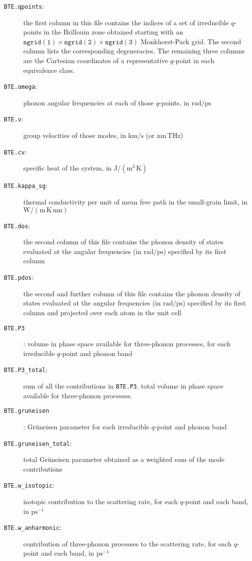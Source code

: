 \documentclass[a4paper,10pt,english]{article}
\begin{document}
\begin{description}
\item[\texttt{BTE.qpoints}:] the first column in this file contains the indices of a set of irreducible $q$-points in the Brillouin zone obtained starting with an $\mathtt{ngrid\left(1\right)}\times\mathtt{ngrid\left(2\right)}\times\mathtt{ngrid\left(3\right)}$ Monkhorst-Pack grid. The second column lists the corresponding degeneracies. The remaining three columns are the Cartesian coordinates of a representative $q$-point in each equivalence class.
\item[\texttt{BTE.omega}:] phonon angular frequencies at each of those $q$-points, in $\mathrm{rad/ps}$
\item[\texttt{BTE.v}:] group velocities of those modes, in $\mathrm{km/s}$ (or $\mathrm{nm}\,\mathrm{THz}$)
\item[\texttt{BTE.cv}:] specific heat of the system, in $\mathrm{J/\left(m^3\,K\right)}$
\item[\texttt{BTE.kappa\_sg}:] thermal conductivity per unit of mean free path in the small-grain limit, in $\mathrm{W/\left(m\,K\,nm\right)}$
\item[\texttt{BTE.dos}:] the second column of this file contains the phonon density of states evaluated at the angular frequencies (in $\mathrm{rad/ps}$) specified by its first column
\item[\texttt{BTE.pdos}:] the second and further column of this file contains the phonon density of states evaluated at the angular frequencies (in $\mathrm{rad/ps}$) specified by its first column and projected over each atom in the unit cell
\item[\texttt{BTE.P3}]: volume in phase space available for three-phonon processes, for each irreducible $q$-point and phonon band
\item[\texttt{BTE.P3\_total}:] sum of all the contributions in \texttt{BTE.P3}, total volume in phase space available for three-phonon processes.
\item[\texttt{BTE.gruneisen}]: Gr\"uneisen parameter for each irreducible $q$-point and phonon band
\item[\texttt{BTE.gruneisen\_total}:] total Gr\"uneisen parameter obtained as a weighted sum of the mode contributions
\item[\texttt{BTE.w\_isotopic}:] isotopic contribution to the scattering rate, for each $q$-point and each band, in $\mathrm{ps^{-1}}$
\item[\texttt{BTE.w\_anharmonic}:] contribution of three-phonon processes to the scattering rate, for each $q$-point and each band, in $\mathrm{ps^{-1}}$

\end{description}
\end{document}
